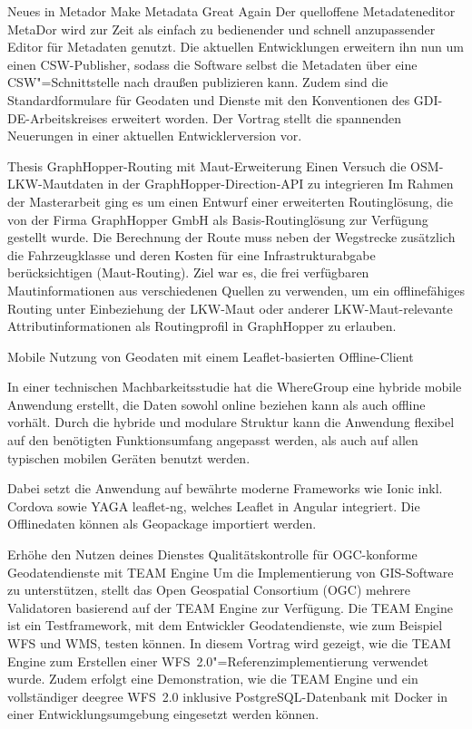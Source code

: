 %
{Neues in Metador}%
{Make Metadata Great Again}%
{Der quelloffene Metadateneditor MetaDor wird zur Zeit als einfach zu bedienender und schnell
anzupassender Editor für Metadaten genutzt. Die aktuellen Entwicklungen erweitern ihn nun um einen
CSW-Publisher, sodass die Software selbst die Metadaten über eine CSW"=Schnittstelle nach draußen
publizieren kann. Zudem sind die Standardformulare für Geodaten und Dienste mit den
Konventionen des GDI-DE-Arbeitskreises erweitert worden. Der Vortrag stellt die spannenden
Neuerungen in einer aktuellen Entwicklerversion vor.}

%
{Thesis GraphHopper-Routing mit Maut-Erweiterung}%
{Einen Versuch die OSM-LKW-Mautdaten in der GraphHopper-Direction-API zu integrieren}%
{Im Rahmen der Masterarbeit ging es um einen Entwurf einer erweiterten
Routinglösung, die von der Firma GraphHopper GmbH als
Basis-Routinglösung zur Verfügung gestellt wurde. Die Berechnung der
Route muss neben der Wegstrecke zusätzlich die Fahrzeugklasse und deren
Kosten für eine Infrastrukturabgabe berücksichtigen (Maut-Routing).
Ziel war es, die frei verfügbaren Mautinformationen aus verschiedenen
Quellen zu verwenden, um ein offlinefähiges Routing unter Einbeziehung
der LKW-Maut oder anderer LKW-Maut-relevante Attributinformationen als
Routingprofil in GraphHopper zu erlauben.}

%
{Mobile Nutzung von Geodaten mit \mbox{einem} Leaflet-basierten Offline-Client}%
{}%
{In einer technischen Machbarkeitsstudie hat die WhereGroup eine hybride mobile
Anwendung erstellt, die Daten sowohl online beziehen kann als auch offline
vorhält. Durch die hybride und modulare Struktur kann die Anwendung flexibel
auf den benötigten Funktionsumfang angepasst werden, als auch auf allen
typischen mobilen Geräten benutzt werden.

Dabei setzt die Anwendung auf
bewährte moderne Frameworks wie Ionic inkl. Cordova sowie YAGA leaflet-ng,
welches Leaflet in Angular integriert. Die Offlinedaten können als Geopackage
importiert werden.}

%
{Erhöhe den Nutzen deines Dienstes}%
{Qualitätskontrolle für OGC-konforme Geodatendienste mit TEAM Engine}%
{Um die Implementierung von GIS-Software zu unterstützen, stellt das Open Geospatial Consortium
(OGC) mehrere Validatoren basierend auf der TEAM Engine zur Verfügung. Die TEAM Engine ist ein
Testframework, mit dem Entwickler Geodatendienste, wie zum Beispiel WFS und WMS, testen können.  In
diesem Vortrag wird gezeigt, wie die TEAM Engine zum Erstellen einer WFS~2.0"=Referenzimplementierung
verwendet wurde. Zudem erfolgt eine Demonstration, wie die TEAM Engine und ein vollständiger deegree
WFS~2.0 inklusive PostgreSQL-Datenbank mit Docker in einer Entwicklungsumgebung eingesetzt werden
können.}

